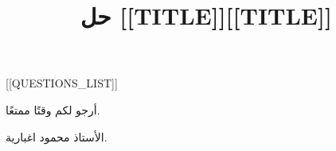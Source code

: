 \documentclass[14pt]{extarticle}
\title{حل [[TITLE]]}
\title{[[TITLE]]}
\begin{document}
\maketitle
\tableofcontents
\clearpage

[[QUESTIONS_LIST]]

\vspace{1cm}
\begin{flushleft}
أرجو لكم وقتًا ممتعًا.

الأستاذ محمود اغبارية.
\end{flushleft}
\end{document}
